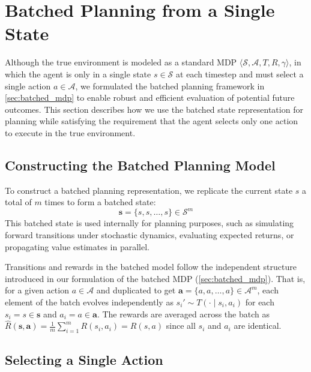 \section{Batched Planning from a Single State}\label{sec:single_state}

Although the true environment is modeled as a standard MDP $\langle \mathcal{S}, \mathcal{A}, T, R, \gamma \rangle$, in which the agent is only in a single state $s \in \mathcal{S}$ at each timestep and must select a single action $a \in \mathcal{A}$, we formulated the batched planning framework in \cref{sec:batched_mdp} to enable robust and efficient evaluation of potential future outcomes.
This section describes how we use the batched state representation for planning while satisfying the requirement that the agent selects only one action to execute in the true environment.

\subsection{Constructing the Batched Planning Model}
To construct a batched planning representation, we replicate the current state $s$ a total of $m$ times to form a batched state:
\begin{equation}
    \mathbf{s} = \{s, s, \ldots, s\} \in \mathcal{S}^m
\end{equation}
This batched state is used internally for planning purposes, such as simulating forward transitions under stochastic dynamics, evaluating expected returns, or propagating value estimates in parallel.

Transitions and rewards in the batched model follow the independent structure introduced in our formulation of the batched MDP (\cref{sec:batched_mdp}). That is, for a given action $a \in \mathcal{A}$ and duplicated to get $\mathbf{a} = \{a, a, \ldots, a\} \in \mathcal{A}^m$, each element of the batch evolves independently as $s_i' \sim T(\cdot \mid s_i, a_i)$ for each $s_i = s \in \mathbf{s}$ and $a_i = a \in \mathbf{a}$.
The rewards are averaged across the batch as $\widehat{R}(\mathbf{s}, \mathbf{a}) = \frac{1}{m} \sum_{i=1}^m R(s_i, a_i) = R(s, a)$ since all $s_i$ and $a_i$ are identical.

\subsection{Selecting a Single Action}\label{sec:select_single_action}

